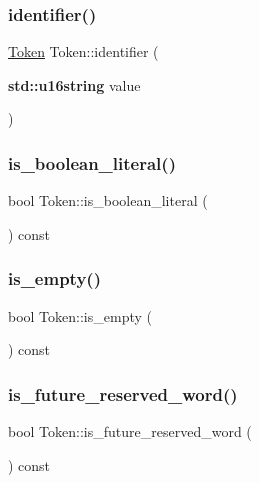 \subsubsection{\texorpdfstring{identifier()}{identifier()}\hspace{0.1cm}{\footnotesize\ttfamily [2/2]}}
{\footnotesize\ttfamily \hyperlink{class_token}{Token} Token\+::identifier (\begin{DoxyParamCaption}\item[{\textbf{ std\+::u16string}}]{value }\end{DoxyParamCaption})\hspace{0.3cm}{\ttfamily [static]}}

\mbox{\label{class_token_a4a628c34f5ac213787a74b19a5d862d9}} 
\subsubsection{\texorpdfstring{is\+\_\+boolean\+\_\+literal()}{is\_boolean\_literal()}}
{\footnotesize\ttfamily bool Token\+::is\+\_\+boolean\+\_\+literal (\begin{DoxyParamCaption}{ }\end{DoxyParamCaption}) const}

\mbox{\label{class_token_aaebab1fc38280c1e7714254916495103}} 
\subsubsection{\texorpdfstring{is\+\_\+empty()}{is\_empty()}}
{\footnotesize\ttfamily bool Token\+::is\+\_\+empty (\begin{DoxyParamCaption}{ }\end{DoxyParamCaption}) const}

\mbox{\label{class_token_a3744fa3b281fc78d02eae4174119b93d}} 
\subsubsection{\texorpdfstring{is\+\_\+future\+\_\+reserved\+\_\+word()}{is\_future\_reserved\_word()}}
{\footnotesize\ttfamily bool Token\+::is\+\_\+future\+\_\+reserved\+\_\+word (\begin{DoxyParamCaption}{ }\end{DoxyParamCaption}) const}

